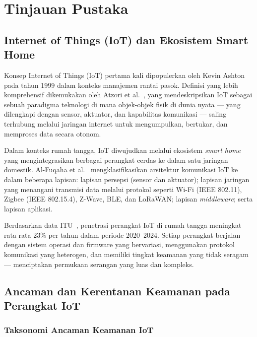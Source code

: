 \documentclass[conference]{IEEEtran}
\begin{document}
\section{Tinjauan Pustaka}

\subsection{Internet of Things (IoT) dan Ekosistem Smart Home}

Konsep Internet of Things (IoT) pertama kali dipopulerkan oleh Kevin Ashton pada tahun 1999 dalam konteks manajemen rantai pasok. Definisi yang lebih komprehensif dikemukakan oleh Atzori et al.\ \cite{atzori2010}, yang mendeskripsikan IoT sebagai sebuah paradigma teknologi di mana objek-objek fisik di dunia nyata --- yang dilengkapi dengan sensor, aktuator, dan kapabilitas komunikasi --- saling terhubung melalui jaringan internet untuk mengumpulkan, bertukar, dan memproses data secara otonom.

Dalam konteks rumah tangga, IoT diwujudkan melalui ekosistem \textit{smart home} yang mengintegrasikan berbagai perangkat cerdas ke dalam satu jaringan domestik. Al-Fuqaha et al.\ \cite{alfuqaha2015} mengklasifikasikan arsitektur komunikasi IoT ke dalam beberapa lapisan: lapisan persepsi (sensor dan aktuator); lapisan jaringan yang menangani transmisi data melalui protokol seperti Wi-Fi (IEEE 802.11), Zigbee (IEEE 802.15.4), Z-Wave, BLE, dan LoRaWAN; lapisan \textit{middleware}; serta lapisan aplikasi.

Berdasarkan data ITU\ \cite{itu2024}, penetrasi perangkat IoT di rumah tangga meningkat rata-rata 23\% per tahun dalam periode 2020--2024. Setiap perangkat berjalan dengan sistem operasi dan firmware yang bervariasi, menggunakan protokol komunikasi yang heterogen, dan memiliki tingkat keamanan yang tidak seragam --- menciptakan permukaan serangan yang luas dan kompleks.

\subsection{Ancaman dan Kerentanan Keamanan pada Perangkat IoT}

\subsubsection{Taksonomi Ancaman Keamanan IoT}
\end{document}

